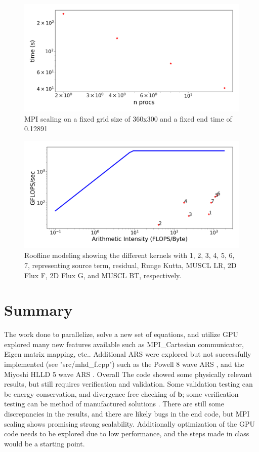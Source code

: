 \documentclass[paper=a4, fontsize=11pt]{scrartcl}
\numberwithin{equation}{section}                %
\numberwithin{figure}{section}                  %
\numberwithin{table}{section}                           %
\begin{document}
\begin{figure}[!htb]
  \centering
  \includegraphics[width=1.0\linewidth]{fig/mpiScaling}
  \caption{MPI scaling on a fixed grid size of 360x300 and a fixed end time of \SI{0.12891}{}}\label{fig:res:mpi}
\end{figure}

\clearpage
\begin{figure}[!htb]
  \centering
  \includegraphics[width=1.0\linewidth]{fig/rooflinemodeling}
  \caption{Roofline modeling showing the different kernels with 1, 2, 3, 4, 5, 6, 7, representing source term, residual, Runge Kutta, MUSCL LR, 2D Flux F, 2D Flux G, and MUSCL BT, respectively.}\label{fig:res:roof}
\end{figure}

\section{Summary}

The work done to parallelize, solve a new set of equations, and utilize GPU explored many new features available such as MPI\_Cartesian communicator, Eigen matrix mapping, etc.. Additional ARS were explored but not successfully implemented (see "src/mhd\_f.cpp") such as the Powell 8 wave ARS \cite{powell1994}, and the Miyoshi HLLD 5 wave ARS \cite{miyoshi2005}. Overall The code showed some physically relevant results, but still requires verification and validation. Some validation testing can be energy conservation, and divergence free checking of $\mathbf{b}$; some verification testing can be method of manufactured solutions \cite{roy2005}. There are still some discrepancies in the results, and there are likely bugs in the end code, but MPI scaling shows promising strong scalability. Additionally optimization of the GPU code needs to be explored due to low performance, and the steps made in class would be a starting point. 

\clearpage
 
  
\end{document}
